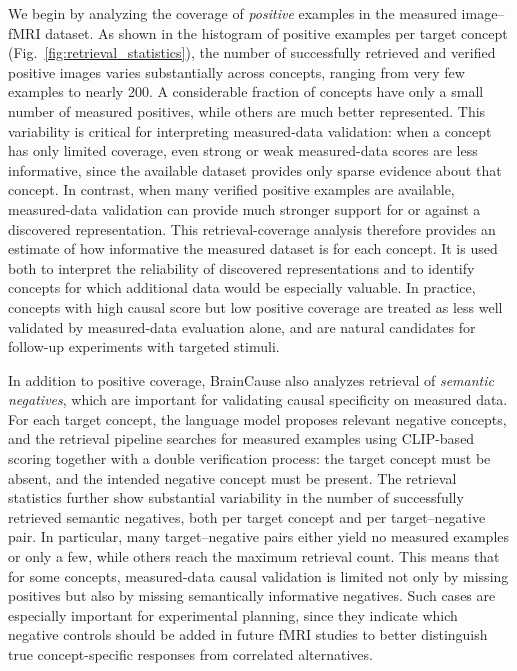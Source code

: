 \documentclass{llmxive}
\begin{document}
We begin by analyzing the coverage of \emph{positive} examples in the measured image--fMRI dataset. As shown in the histogram of positive examples per target concept (Fig.~\ref{fig:retrieval_statistics}), the number of successfully retrieved and verified positive images varies substantially across concepts, ranging from very few examples to nearly 200. A considerable fraction of concepts have only a small number of measured positives, while others are much better represented. This variability is critical for interpreting measured-data validation: when a concept has only limited coverage, even strong or weak measured-data scores are less informative, since the available dataset provides only sparse evidence about that concept. In contrast, when many verified positive examples are available, measured-data validation can provide much stronger support for or against a discovered representation.
This retrieval-coverage analysis therefore provides an estimate of how informative the measured dataset is for each concept. It is used both to interpret the reliability of discovered representations and to identify concepts for which additional data would be especially valuable. In practice, concepts with high causal score but low positive coverage are treated as less well validated by measured-data evaluation alone, and are natural candidates for follow-up experiments with targeted stimuli.

In addition to positive coverage, BrainCause also analyzes retrieval of \emph{semantic negatives}, which are important for validating causal specificity on measured data. For each target concept, the language model proposes relevant negative concepts, and the retrieval pipeline searches for measured examples using CLIP-based scoring together with a double verification process: the target concept must be absent, and the intended negative concept must be present. The retrieval statistics further show substantial variability in the number of successfully retrieved semantic negatives, both per target concept and per target--negative pair. In particular, many target--negative pairs either yield no measured examples or only a few, while others reach the maximum retrieval count. This means that for some concepts, measured-data causal validation is limited not only by missing positives but also by missing semantically informative negatives. Such cases are especially important for experimental planning, since they indicate which negative controls should be added in future fMRI studies to better distinguish true concept-specific responses from correlated alternatives.
\end{document}
